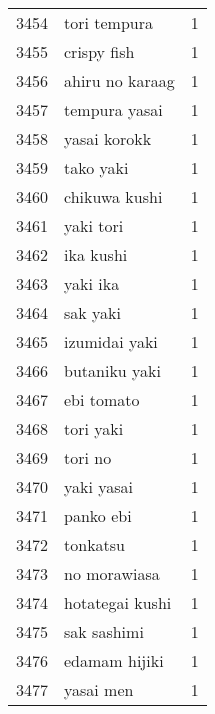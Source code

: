 \begin{tabular}{llr}
3454 &                                       tori tempura &      1 \\
3455 &                                        crispy fish &      1 \\
3456 &                                    ahiru no karaag &      1 \\
3457 &                                      tempura yasai &      1 \\
3458 &                                       yasai korokk &      1 \\
3459 &                                          tako yaki &      1 \\
3460 &                                      chikuwa kushi &      1 \\
3461 &                                          yaki tori &      1 \\
3462 &                                          ika kushi &      1 \\
3463 &                                           yaki ika &      1 \\
3464 &                                           sak yaki &      1 \\
3465 &                                      izumidai yaki &      1 \\
3466 &                                      butaniku yaki &      1 \\
3467 &                                         ebi tomato &      1 \\
3468 &                                          tori yaki &      1 \\
3469 &                                            tori no &      1 \\
3470 &                                         yaki yasai &      1 \\
3471 &                                          panko ebi &      1 \\
3472 &                                           tonkatsu &      1 \\
3473 &                                       no morawiasa &      1 \\
3474 &                                    hotategai kushi &      1 \\
3475 &                                        sak sashimi &      1 \\
3476 &                                      edamam hijiki &      1 \\
3477 &                                          yasai men &      1 \\

\end{tabular}
